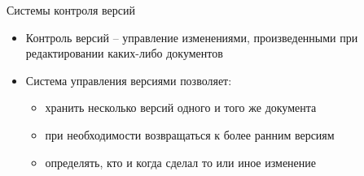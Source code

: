 \begin{frame}{Системы контроля версий}
    \begin{itemize}
        \item
              Контроль версий -- управление изменениями, произведенными при редактировании каких-либо документов
        \item
              Система управления версиями позволяет:
              \begin{itemize}
                  \item
                        хранить несколько версий одного и того же документа
                  \item
                        при необходимости возвращаться к более ранним версиям
                  \item
                        определять, кто и когда сделал то или иное изменение
              \end{itemize}
    \end{itemize}
\end{frame}